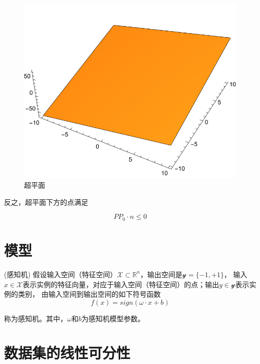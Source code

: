 \begin{figure}
    \centering
    \includegraphics[scale=0.7]{figures/超平面.pdf}
    \caption{超平面}
\end{figure}

反之，超平面下方的点满足

\begin{equation}
    PP_0\cdot n\leqslant 0
\end{equation}

\section{模型}

\begin{define}
    (感知机) 假设输入空间（特征空间）$\mathcal{X}\subset \mathbb{R}^n$，输出空间是$\mathcal{y}=\{-1,+1\}$，
    输入$x\in \mathcal{X}$表示实例的特征向量，对应于输入空间（特征空间）的点；输出$y\in \mathcal{y}$表示实例的类别，
    由输入空间到输出空间的如下符号函数
    \begin{equation}
        f(x)=sign(\omega\cdot x+b)
    \end{equation}

    称为感知机。其中，$\omega$和$b$为感知机模型参数。
\end{define}


\section{数据集的线性可分性}

